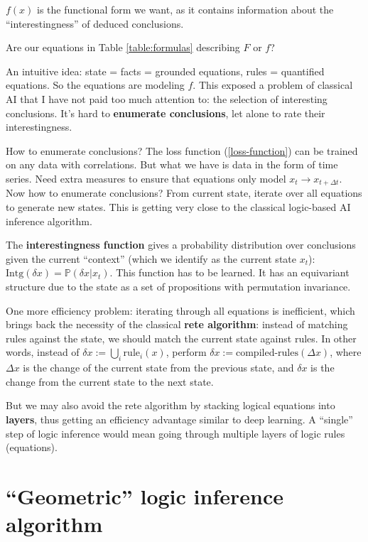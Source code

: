 $f(x)$ is the functional form we want, as it contains information about the ``interestingness'' of deduced conclusions.

Are our equations in Table \ref{table:formulas} describing $F$ or $f$?  

An intuitive idea:  state = facts = grounded equations, rules = quantified equations.  So the equations are modeling $f$.  This exposed a problem of classical AI that I have not paid too much attention to:  the selection of interesting conclusions.  It's hard to \textbf{enumerate conclusions}, let alone to rate their interestingness.

How to enumerate conclusions?  The loss function (\ref{loss-function}) can be trained on any data with correlations.  But what we have is data in the form of time series.  Need extra measures to ensure that equations only model $x_t \rightarrow x_{t+\Delta t}$.  Now how to enumerate conclusions?  From current state, iterate over all equations to generate new states.  This is getting very close to the classical logic-based AI inference algorithm.

The \textbf{interestingness function} gives a probability distribution over conclusions given the current ``context'' (which we identify as the current state $x_t$): $ \mathrm{Intg}(\delta x) = \mathbb{P}(\delta x | x_t) $.  This function has to be learned.  It has an equivariant structure due to the state as a set of propositions with permutation invariance.

One more efficiency problem:  iterating through all equations is inefficient, which brings back the necessity of the classical \textbf{rete algorithm}:  instead of matching rules against the state, we should match the current state against rules.  In other words, instead of $\delta x := \bigcup_i \mathrm{rule}_i (x)$, perform $\delta x := \text{compiled-rules}(\Delta x) $, where $\Delta x$ is the change of the current state from the previous state, and $\delta x$ is the change from the current state to the next state.

But we may also avoid the rete algorithm by stacking logical equations into \textbf{layers}, thus getting an efficiency advantage similar to deep learning.  A ``single'' step of logic inference would mean going through multiple layers of logic rules (equations).  

\section{``Geometric'' logic inference algorithm}

